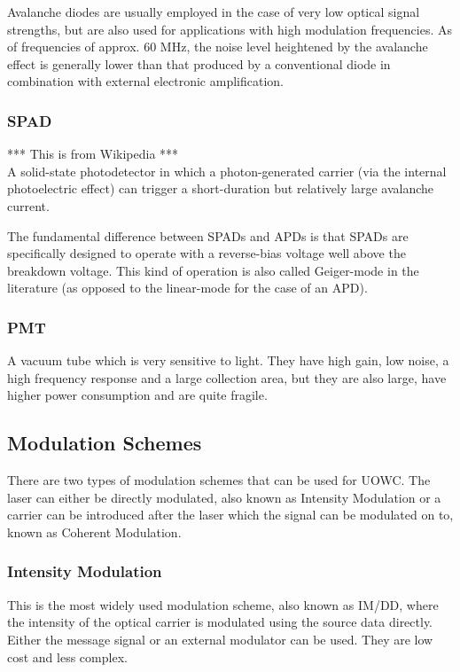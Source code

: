 Avalanche diodes are usually employed in the case of very low optical signal
strengths, but are also used for applications with high modulation frequencies.
As of frequencies of approx. 60 MHz, the noise level heightened by the
avalanche effect is generally lower than that produced by a conventional diode
in combination with external electronic amplification.

\subsubsection{\ac{SPAD}}
*** This is from Wikipedia ***\\
A solid-state photodetector in which a photon-generated carrier (via the
internal photoelectric effect) can trigger a short-duration but relatively
large avalanche current.

The fundamental difference between \ac{SPAD}s and \ac{APD}s is that SPADs are
specifically designed to operate with a reverse-bias voltage well above the
breakdown voltage. This kind of operation is also called Geiger-mode in the
literature (as opposed to the linear-mode for the case of an \ac{APD}).

\subsubsection{\ac{PMT}}
A vacuum tube which is very sensitive to light. They have high gain, low noise,
a high frequency response and a large collection area, but they are also large,
have higher power consumption and are quite fragile.

\subsection{Modulation Schemes}
There are two types of modulation schemes that can be used for \ac{UOWC}.
The laser can either be directly modulated, also known as Intensity Modulation
or a carrier can be introduced after the laser which the signal can be
modulated on to, known as Coherent Modulation.

\subsubsection{Intensity Modulation}
This is the most widely used modulation scheme, also known as \ac{IM/DD},
where the intensity of the optical carrier is modulated using the source
data directly. Either the message signal or an external modulator can be used. They are low cost and less complex.


